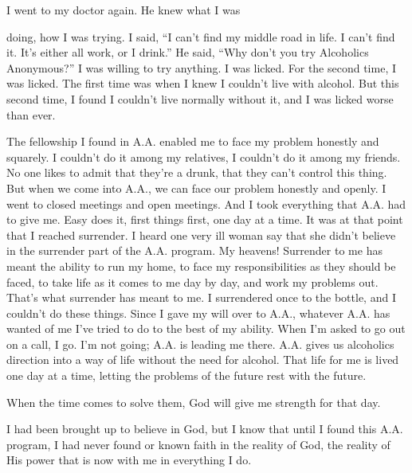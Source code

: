 \begin{biblechapter}
I went to my doctor again. He knew what I was

doing, how I was trying. I said, “I can’t find my middle road in life. I can’t find it. It’s either all work, or I drink.” He said, “Why don’t you try Alcoholics Anonymous?” I was willing to try anything. I was licked. For the second time, I was licked. The first time was when I knew I couldn’t live with alcohol. But this second time, I found I couldn’t live normally without it, and I was licked worse than ever.

The fellowship I found in A.A. enabled me to face my problem honestly and squarely. I couldn’t do it among my relatives, I couldn’t do it among my friends. No one likes to admit that they’re a drunk, that they can’t control this thing. But when we come into A.A., we can face our problem honestly and openly. I went to closed meetings and open meetings. And I took everything that A.A. had to give me. Easy does it, first things first, one day at a time. It was at that point that I reached surrender. I heard one very ill woman say that she didn’t believe in the surrender part of the A.A. program. My heavens! Surrender to me has meant the ability to run my home, to face my responsibilities as they should be faced, to take life as it comes to me day by day, and work my problems out. That’s what surrender has meant to me. I surrendered once to the bottle, and I couldn’t do these things. Since I gave my will over to A.A., whatever A.A. has wanted of me I’ve tried to do to the best of my ability. When I’m asked to go out on a call, I go. I’m not going; A.A. is leading me there. A.A. gives us alcoholics direction into a way of life without the need for alcohol. That life for me is lived one day at a time, letting the problems of the future rest with the future.

When the time comes to solve them, God will give me strength for that day.

I had been brought up to believe in God, but I know that until I found this A.A. program, I had never found or known faith in the reality of God, the reality of His power that is now with me in everything I do.
\end{biblechapter}
